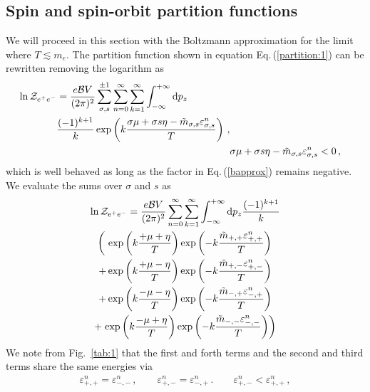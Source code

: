 \documentclass[aps,prd,floatfix,reprint]{revtex4-2}
\newcommand{\req}[1]{Eq.\,(\ref{#1})}
\newcommand{\rf}[1]{Fig.~{\ref{#1}}}
\begin{document}
\subsection{Spin and spin-orbit partition functions}
\label{sec:paradia}
\noindent We will proceed in this section with the Boltzmann approximation for the limit where $T\lesssim m_e$. The partition function shown in equation \req{partition:1} can be rewritten removing the logarithm as
\begin{align}
\begin{split}
\label{partitionpower:1}
\ln{{\cal Z}_{e^{+}e^{-}}}&=\frac{e{\cal B}V}{(2\pi)^{2}}\sum_{\sigma,s}^{\pm1}\sum_{n=0}^{\infty}\sum_{k=1}^{\infty}\int_{-\infty}^{+\infty}{\rm d}p_{z}\\
&\frac{(-1)^{k+1}}{k}\exp\left({k\frac{\sigma\mu+\sigma s\eta-{\tilde m}_{\sigma,s}\varepsilon^{n}_{\sigma,s}}{T}}\right)\,,    
\end{split}\\
\label{bapprox} 
&\sigma\mu+\sigma s\eta-{\tilde m}_{\sigma,s}\varepsilon_{\sigma,s}^{n}<0\,,
\end{align}
which is well behaved as long as the factor in \req{bapprox} remains negative. We evaluate the sums over $\sigma$ and $s$ as
\begin{multline}
    \label{partitionpower:2}
    \ln{{\cal Z}_{e^{+}e^{-}}}=\frac{e{\cal B}V}{(2\pi)^{2}}\sum_{n=0}^{\infty}\sum_{k=1}^{\infty}\int_{-\infty}^{+\infty}{\rm d}p_{z}\frac{(-1)^{k+1}}{k}\\
    \left(\ \exp\left(k\frac{+\mu+\eta}{T}\right)\exp\left(-k\frac{{\tilde m}_{+,+}\varepsilon_{+,+}^{n}}{T}\right)\right.\\
    +\exp\left(k\frac{+\mu-\eta}{T}\right)\exp\left(-k\frac{{\tilde m}_{+,-}\varepsilon_{+,-}^{n}}{T}\right)\\
    +\exp\left(k\frac{-\mu-\eta}{T}\right)\exp\left(-k\frac{{\tilde m}_{-,+}\varepsilon_{-,+}^{n}}{T}\right)\\
    +\left.\exp\left(k\frac{-\mu+\eta}{T}\right)\exp\left(-k\frac{{\tilde m}_{-,-}\varepsilon_{-,-}^{n}}{T}\right)\right)
\end{multline}
We note from \rf{tab:1} that the first and forth terms and the second and third terms share the same energies via
\begin{align}
    \label{partitionpower:3}
    \varepsilon_{+,+}^{n}=\varepsilon_{-,-}^{n}\,,\qquad
    \varepsilon_{+,-}^{n}=\varepsilon_{-,+}^{n}\,.\qquad
    \varepsilon_{+,-}^{n}<\varepsilon_{+,+}^{n}\,,
\end{align}
\end{document}
